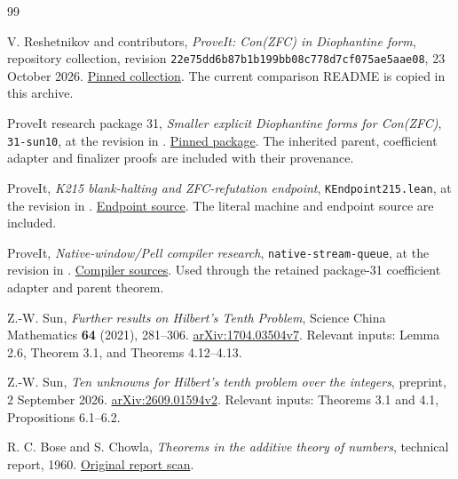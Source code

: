 \documentclass[11pt]{article}
\newcommand{\file}[1]{\nolinkurl{#1}}
\theoremstyle{definition}
\theoremstyle{remark}
\numberwithin{equation}{section}
\begin{document}
\begin{thebibliography}{99}

V. Reshetnikov and contributors,
\emph{ProveIt: Con(ZFC) in Diophantine form}, repository collection,
revision \texttt{22e75dd6b87b1b199bb08c778d7cf075ae5aae08},
23 October 2026.
\href{https://github.com/VladimirReshetnikov/ProveIt/tree/22e75dd6b87b1b199bb08c778d7cf075ae5aae08/SetTheory/Cardinals/docs/reports/hilbert-tenth-problem/con-zfc-diophantine-forms}{Pinned collection}.
The current comparison README is copied in this archive.

ProveIt research package 31,
\emph{Smaller explicit Diophantine forms for Con(ZFC)},
\file{31-sun10}, at the revision in \cite{repo}.
\href{https://github.com/VladimirReshetnikov/ProveIt/tree/22e75dd6b87b1b199bb08c778d7cf075ae5aae08/SetTheory/Cardinals/docs/reports/hilbert-tenth-problem/con-zfc-diophantine-forms/31-sun10}{Pinned package}.
The inherited parent, coefficient adapter and finalizer proofs are
included with their provenance.

ProveIt,
\emph{K215 blank-halting and ZFC-refutation endpoint},
\file{KEndpoint215.lean}, at the revision in \cite{repo}.
\href{https://github.com/VladimirReshetnikov/ProveIt/blob/22e75dd6b87b1b199bb08c778d7cf075ae5aae08/Computability/BusyBeaver/Lean/BusyBeaver/ZFC/KEndpoint215.lean}{Endpoint source}.
The literal machine and endpoint source are included.

ProveIt,
\emph{Native-window/Pell compiler research},
\file{native-stream-queue},
at the revision in \cite{repo}.
\href{https://github.com/VladimirReshetnikov/ProveIt/tree/22e75dd6b87b1b199bb08c778d7cf075ae5aae08/Computability/HilbertTenthProblem/Papers/research-wip/native-stream-queue}{Compiler sources}.
Used through the retained package-31 coefficient adapter and parent theorem.

Z.-W. Sun,
\emph{Further results on Hilbert's Tenth Problem},
Science China Mathematics \textbf{64} (2021), 281--306.
\href{https://arxiv.org/html/1704.03504v7}{arXiv:1704.03504v7}.
Relevant inputs: Lemma 2.6, Theorem 3.1, and Theorems 4.12--4.13.

Z.-W. Sun,
\emph{Ten unknowns for Hilbert's tenth problem over the integers},
preprint, 2 September 2026.
\href{https://arxiv.org/html/2609.01594v2}{arXiv:2609.01594v2}.
Relevant inputs: Theorems 3.1 and 4.1, Propositions 6.1--6.2.

R. C. Bose and S. Chowla,
\emph{Theorems in the additive theory of numbers},
technical report, 1960.
\href{https://www.cs.umd.edu/~gasarch/COURSES/858/S13/BoseChowla.pdf}{Original report scan}.


\end{thebibliography}
\end{document}
